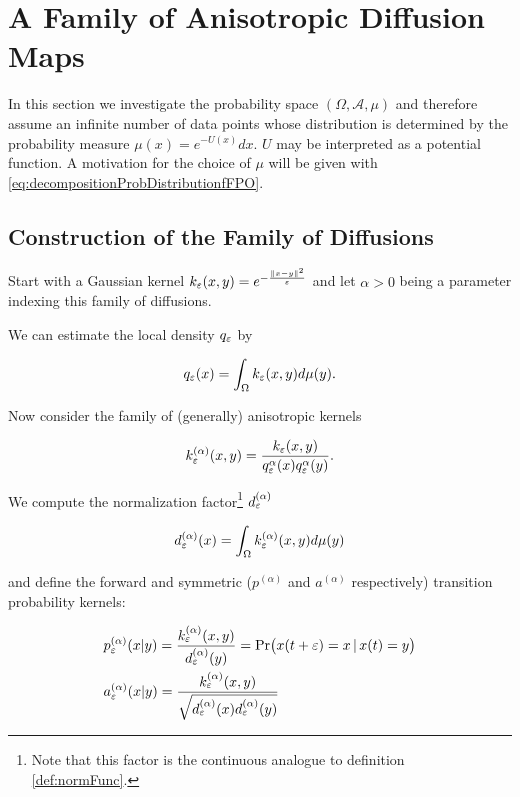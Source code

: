 \section{A Family of Anisotropic Diffusion Maps}

In this section we investigate the probability space $(\Omega, \mathcal{A}, \mu)$ and therefore assume an infinite number of data points whose distribution is determined by the probability measure $\mu(x)=e^{-U(x)}dx$. $U$ may be interpreted as a potential function. A motivation for the choice of $\mu$ will be given with \eqref{eq:decompositionProbDistributionfFPO}.

\subsection{Construction of the Family of Diffusions}
Start with a Gaussian kernel $k_\varepsilon(x,y)=e^{-\frac{\|x-y\|^2}{\varepsilon}}$ and let $\alpha > 0$ being a parameter indexing this family of diffusions.

We can estimate the local density $q_\varepsilon$ by 

\begin{definition}
$$q_\varepsilon(x)=\int_\Omega k_\varepsilon(x,y)d\mu(y).$$
\end{definition}

Now consider the family of (generally) anisotropic kernels

\begin{definition}
$$k_\varepsilon^{(\alpha)}(x,y)=\frac{k_\varepsilon(x,y)}{q_\varepsilon^\alpha(x)q_\varepsilon^\alpha(y)}.$$
\end{definition}

We compute the normalization factor\footnote{Note that this factor is the continuous analogue to definition \ref{def:normFunc}.} $d_\varepsilon^{(\alpha)}$

$$d_\varepsilon^{(\alpha)}(x) = \int_\Omega k_\varepsilon^{(\alpha)}(x,y)d\mu(y)$$

and define the forward and symmetric ($p^{(\alpha)}$ and $a^{(\alpha)}$ respectively) transition probability kernels:

\begin{definition}\begin{equation*}\begin{aligned}
&p_\varepsilon^{(\alpha)}(x|y) = \frac{k_\varepsilon^{(\alpha)}(x,y)}{d_\varepsilon^{(\alpha)}(y)} = \text{Pr}\big(x(t+\varepsilon)=x \, |\, x(t)=y\big)\\
&a_\varepsilon^{(\alpha)}(x|y) = \frac{k_\varepsilon^{(\alpha)}(x,y)}{\sqrt{d_\varepsilon^{(\alpha)}(x)d_\varepsilon^{(\alpha)}(y)}}
\end{aligned}\end{equation*}\end{definition}

